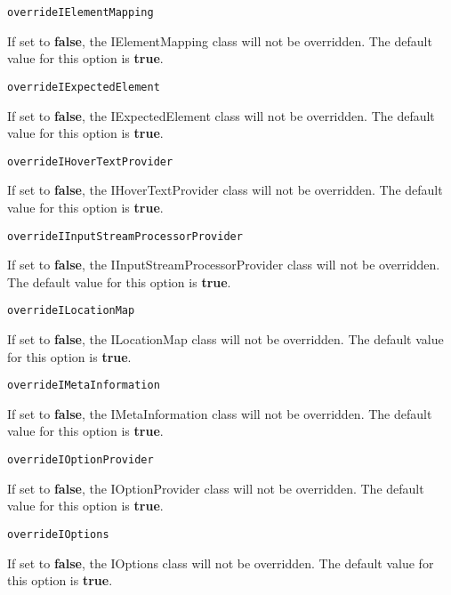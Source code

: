 \noindent\texttt{overrideIElementMapping}
\begin{myindentpar}{1cm}
If set to \textbf{false}, the IElementMapping class will not be overridden. The default value for this option is \textbf{true}.
\end{myindentpar}

\noindent\texttt{overrideIExpectedElement}
\begin{myindentpar}{1cm}
If set to \textbf{false}, the IExpectedElement class will not be overridden. The default value for this option is \textbf{true}.
\end{myindentpar}

\noindent\texttt{overrideIHoverTextProvider}
\begin{myindentpar}{1cm}
If set to \textbf{false}, the IHoverTextProvider class will not be overridden. The default value for this option is \textbf{true}.
\end{myindentpar}

\noindent\texttt{overrideIInputStreamProcessorProvider}
\begin{myindentpar}{1cm}
If set to \textbf{false}, the IInputStreamProcessorProvider class will not be overridden. The default value for this option is \textbf{true}.
\end{myindentpar}

\noindent\texttt{overrideILocationMap}
\begin{myindentpar}{1cm}
If set to \textbf{false}, the ILocationMap class will not be overridden. The default value for this option is \textbf{true}.
\end{myindentpar}

\noindent\texttt{overrideIMetaInformation}
\begin{myindentpar}{1cm}
If set to \textbf{false}, the IMetaInformation class will not be overridden. The default value for this option is \textbf{true}.
\end{myindentpar}

\noindent\texttt{overrideIOptionProvider}
\begin{myindentpar}{1cm}
If set to \textbf{false}, the IOptionProvider class will not be overridden. The default value for this option is \textbf{true}.
\end{myindentpar}

\noindent\texttt{overrideIOptions}
\begin{myindentpar}{1cm}
If set to \textbf{false}, the IOptions class will not be overridden. The default value for this option is \textbf{true}.
\end{myindentpar}

